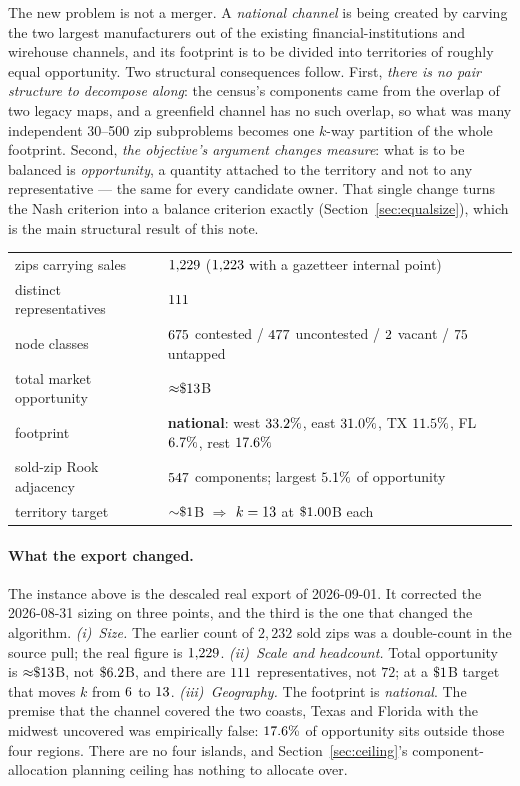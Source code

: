 \documentclass[11pt]{article}
\theoremstyle{definition}
\begin{document}
The new problem is not a merger. A \emph{national channel} is being created by carving the
two largest manufacturers out of the existing financial-institutions and wirehouse
channels, and its footprint is to be divided into territories of roughly equal
opportunity. Two structural consequences follow. First, \emph{there is no pair structure
to decompose along}: the census's components came from the overlap of two legacy maps, and
a greenfield channel has no such overlap, so what was many independent 30--500 zip
subproblems becomes one $k$-way partition of the whole footprint. Second, \emph{the
objective's argument changes measure}: what is to be balanced is \emph{opportunity}, a
quantity attached to the territory and not to any representative --- the same for every
candidate owner. That single change turns the Nash criterion into a balance criterion
exactly (Section~\ref{sec:equalsize}), which is the main structural result of this note.

\begin{center}
\small
\begin{tabular}{ll}
\toprule
zips carrying sales & $1{,}229$ ($1{,}223$ with a gazetteer internal point)\\
distinct representatives & $111$\\
node classes & $675$ contested / $477$ uncontested /
                $2$ vacant / $75$ untapped\\
total market opportunity & ${\approx}\$13$B\\
footprint & \textbf{national}: west $33.2\%$, east $31.0\%$,
            TX $11.5\%$, FL $6.7\%$, rest $17.6\%$\\
sold-zip Rook adjacency & $547$ components; largest
            $5.1\%$ of opportunity\\
territory target & ${\sim}\$1$B $\Rightarrow$ $k = 13$ at
            $\$1.00$B each\\
\bottomrule
\end{tabular}
\end{center}

\paragraph{What the export changed.}
The instance above is the descaled real export of 2026-09-01. It corrected the 2026-08-31
sizing on three points, and the third is the one that changed the algorithm.
\emph{(i)~Size.} The earlier count of $2{,}232$ sold zips was a double-count in the source
pull; the real figure is $1{,}229$. \emph{(ii)~Scale and headcount.} Total opportunity is
${\approx}\$13$B, not $\$6.2$B, and there are $111$ representatives, not
$72$; at a $\$1$B target that moves $k$ from $6$ to $13$.
\emph{(iii)~Geography.} The footprint is \emph{national}. The premise that the channel
covered the two coasts, Texas and Florida with the midwest uncovered was empirically false:
$17.6\%$ of opportunity sits outside those four regions. There are no four islands,
and Section~\ref{sec:ceiling}'s component-allocation planning ceiling has nothing to
allocate over.
\end{document}
